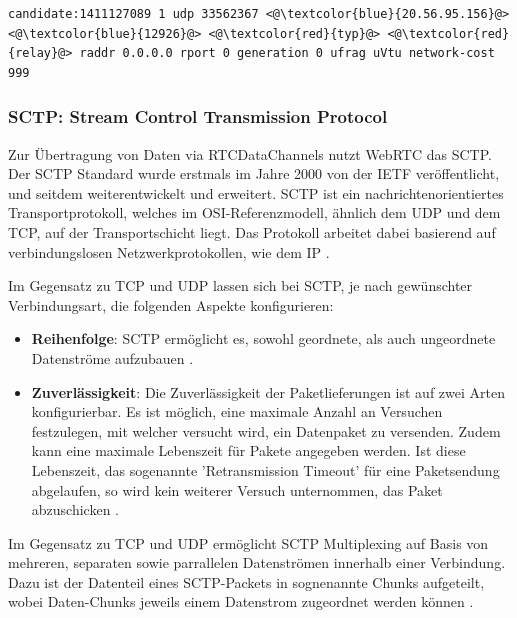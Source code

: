 \lstset{style=STYLE_ICE_CANDIDATE_0}
\begin{minipage}{\textwidth}
\begin{lstlisting}[caption={SDP-Datenstring eines Relais-ICE-Kandidaten},captionpos=b,label={lst:candidate}]
candidate:1411127089 1 udp 33562367 <@\textcolor{blue}{20.56.95.156}@> <@\textcolor{blue}{12926}@> <@\textcolor{red}{typ}@> <@\textcolor{red}{relay}@> raddr 0.0.0.0 rport 0 generation 0 ufrag uVtu network-cost 999
\end{lstlisting}
\end{minipage}

\subsubsection{SCTP: Stream Control Transmission Protocol}
Zur Übertragung von Daten via RTCDataChannels nutzt \acs{WebRTC} das \acf{SCTP}. Der \acs{SCTP} Standard wurde erstmals im Jahre 2000 von der \acs{IETF} veröffentlicht, und seitdem weiterentwickelt und erweitert. \acs{SCTP} ist ein nachrichtenorientiertes Transportprotokoll, welches im \acf{OSI}-Referenzmodell, ähnlich dem \acf{UDP} und dem \acf{TCP}, auf der Transportschicht liegt. Das Protokoll arbeitet dabei basierend auf verbindungslosen Netzwerkprotokollen, wie dem \acf{IP} \cite{sctpRFC}.\par

Im Gegensatz zu \acs{TCP} und \acs{UDP} lassen sich bei \acs{SCTP}, je nach gewünschter Verbindungsart, die folgenden Aspekte konfigurieren:
\begin{itemize}
	\item\textbf{Reihenfolge}: \acs{SCTP} ermöglicht es, sowohl geordnete, als auch ungeordnete Datenströme aufzubauen \cite{sctpRFC}.
	\item\textbf{Zuverlässigkeit}: Die Zuverlässigkeit der Paketlieferungen ist auf zwei Arten konfigurierbar. Es ist möglich, eine maximale Anzahl an Versuchen festzulegen, mit welcher versucht wird, ein Datenpaket zu versenden. Zudem kann eine maximale Lebenszeit für Pakete angegeben werden. Ist diese Lebenszeit, das sogenannte 'Retransmission Timeout' für eine Paketsendung abgelaufen, so wird kein weiterer Versuch unternommen, das Paket abzuschicken \cite{sctpRFC}.
\end{itemize}

\vspace{11pt}

Im Gegensatz zu \acs{TCP} und \acs{UDP} ermöglicht \acs{SCTP} Multiplexing auf Basis von mehreren, separaten sowie parrallelen Datenströmen innerhalb einer Verbindung. Dazu ist der Datenteil eines \acs{SCTP}-Packets in sognenannte \glqq{}Chunks\grqq{}  aufgeteilt, wobei Daten-Chunks jeweils einem Datenstrom zugeordnet werden können \cite{sctpRFC}.\par

